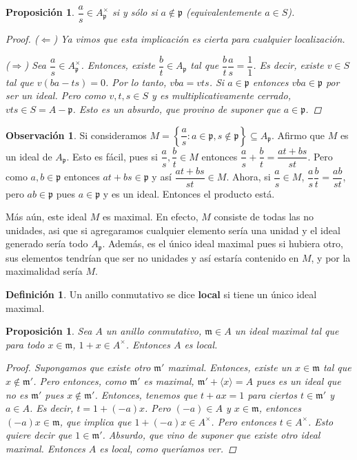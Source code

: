 \documentclass[12pt]{book}
\newtheorem{prop}[teo]{Proposición}
\theoremstyle{definition}
\newtheorem{obs}[teo]{Observación}
\newtheorem{defn}[teo]{Definición}
\begin{document}
\begin{prop}
$\dfrac{a}{s}\in A_\mathfrak{p}^\times$ si y sólo si $a\notin \mathfrak{p}$ (equivalentemente $a\in S$).
\begin{proof}
($\Longleftarrow$) Ya vimos que esta implicación es cierta para cualquier localización.

($\Longrightarrow$) Sea $\dfrac{a}{s}\in A_\mathfrak{p}^\times$. Entonces, existe $\dfrac{b}{t}\in A_\mathfrak{p}$ tal que $\dfrac{b}{t}\dfrac{a}{s}=\dfrac{1}{1}$. Es decir, existe $v\in S$ tal que $v(ba-ts)=0$. Por lo tanto, $vba = vts$. Si $a\in \mathfrak{p}$ entonces $vba\in\mathfrak{p}$ por ser un ideal. Pero como $v,t,s\in S$ y es multiplicativamente cerrado, $vts\in S=A-\mathfrak{p}$. Esto es un absurdo, que provino de suponer que $a\in\mathfrak{p}$.
\end{proof}
\end{prop}

\begin{obs}
Si consideramos $M= \left\{\dfrac{a}{s} : a\in\mathfrak{p}, s\notin\mathfrak{p}\right\}\subseteq A_\mathfrak{p}$. Afirmo que $M$ es un ideal de $A_\mathfrak{p}$. Esto es fácil, pues si $\dfrac{a}{s},\dfrac{b}{t}\in M$ entonces $\dfrac{a}{s}+\dfrac{b}{t} = \dfrac{at+bs}{st}$. Pero como $a,b\in\mathfrak{p}$ entonces $at+bs\in\mathfrak{p}$ y así $\dfrac{at+bs}{st}\in M$. Ahora, si $\dfrac{a}{s}\in M$, $\dfrac{a}{s}\dfrac{b}{t} = \dfrac{ab}{st}$, pero $ab\in\mathfrak{p}$ pues $a\in\mathfrak{p}$ y es un ideal. Entonces el producto está.

Más aún, este ideal $M$ es maximal. En efecto, $M$ consiste de todas las no unidades, asi que si agregaramos cualquier elemento sería una unidad y el ideal generado sería todo $A_\mathfrak{p}$. Además, es el único ideal maximal pues si hubiera otro, sus elementos tendrían que ser no unidades y así estaría contenido en $M$, y por la maximalidad sería $M$.
\end{obs}

\begin{defn}
Un anillo conmutativo se dice \textbf{local} si tiene un único ideal maximal.
\end{defn}

\begin{prop}
Sea $A$ un anillo conmutativo, $\mathfrak{m}\in A$ un ideal maximal tal que para todo $x\in\mathfrak{m}$, $1+x\in A^\times$. Entonces $A$ es local.
\begin{proof}
Supongamos que existe otro $\mathfrak{m}'$ maximal. Entonces, existe un $x\in \mathfrak{m}$ tal que $x\notin \mathfrak{m}'$. Pero entonces, como $\mathfrak{m}'$ es maximal, $\mathfrak{m}'+ \langle x\rangle = A$ pues es un ideal que no es $\mathfrak{m}'$ pues $x\notin \mathfrak{m}'$. Entonces, tenemos que $t + ax = 1$ para ciertos $t\in\mathfrak{m}'$ y $a\in A$. Es decir, $t = 1 + (-a)x$. Pero $(-a)\in A$ y $x\in \mathfrak{m}$, entonces $(-a)x\in \mathfrak{m}$, que implica que $1 + (-a)x\in A^\times$. Pero entonces $t\in A^\times$. Esto quiere decir que $1\in \mathfrak{m}'$. Absurdo, que vino de suponer que existe otro ideal maximal. Entonces $A$ es local, como queríamos ver.
\end{proof}
\end{prop}
\end{document}

